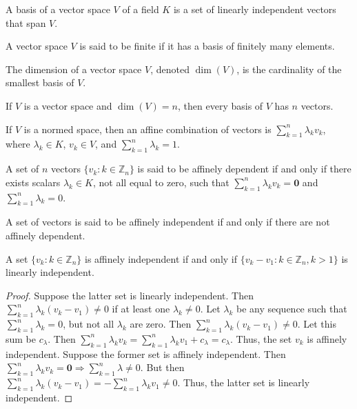 \documentclass[crop=false,class=article,oneside]{standalone}
\begin{document}
        \begin{definition}
        A basis of a vector space $V$ of a field $K$ is a set of linearly independent vectors that span $V$.
        \end{definition}
        \begin{definition}
        A vector space $V$ is said to be finite if it has a basis of finitely many elements.
        \end{definition}
        \begin{definition}
        The dimension of a vector space $V$, denoted $\dim(V)$, is the cardinality of the smallest basis of $V$.
        \end{definition}
        \begin{theorem}
        If $V$ is a vector space and $\dim(V)=n$, then every basis of $V$ has $n$ vectors.
        \end{theorem}
        \begin{definition}
        If $V$ is a normed space, then an affine combination of vectors is $\sum_{k=1}^{n} \lambda_k v_k$, where $\lambda_k \in K$, $v_k \in V$, and $\sum_{k=1}^{n} \lambda_k = 1$.
        \end{definition}
        \begin{definition}
        A set of $n$ vectors $\{v_k:k\in \mathbb{Z}_n\}$ is said to be affinely dependent if and only if there exists scalars $\lambda_k \in K$, not all equal to zero, such that $\sum_{k=1}^{n} \lambda_k v_k = \mathbf{0}$ and $\sum_{k=1}^{n} \lambda_k = 0$.
        \end{definition}
        \begin{definition}
        A set of vectors is said to be affinely independent if and only if there are not affinely dependent.
        \end{definition}
        \begin{theorem}
        A set $\{v_k:k\in \mathbb{Z}_n\}$ is affinely independent if and only if $\{v_k-v_1:k\in \mathbb{Z}_n, k>1\}$ is linearly independent.
        \end{theorem}
        \begin{proof}
        Suppose the latter set is linearly independent. Then $\sum_{k=1}^{n} \lambda_k(v_k-v_1) \ne 0$ if at least one $\lambda_k \ne 0$. Let $\lambda_k$ be any sequence such that $\sum_{k=1}^{n} \lambda_k = 0$, but not all $\lambda_k$ are zero. Then $\sum_{k=1}^{n} \lambda_k(v_k-v_1)\ne 0$. Let this sum be $c_{\lambda}$. Then $\sum_{k=1}^{n} \lambda_k v_k = \sum_{k=1}^{n} \lambda_k v_1 + c_\lambda = c_{\lambda}$. Thus, the set $v_k$ is affinely independent. Suppose the former set is affinely independent. Then $\sum_{k=1}^{n} \lambda_k v_k = \mathbf{0} \Rightarrow \sum_{k=1}^{n} \lambda \ne 0$. But then $\sum_{k=1}^{n}\lambda_k (v_k-v_1) = - \sum_{k=1}^{n} \lambda_k v_1 \ne 0$. Thus, the latter set is linearly independent.
        \end{proof}
\end{document}
